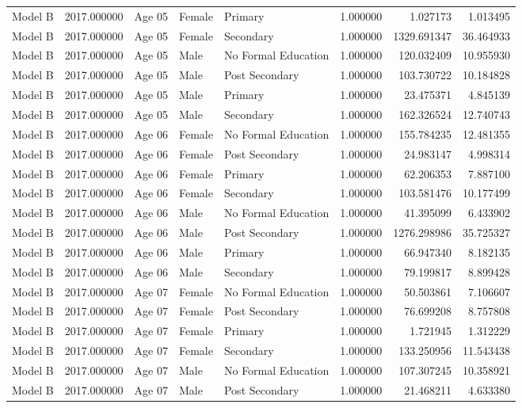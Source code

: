 \begin{table}[ht]
\begin{tabular}{lrlllrrr}
Model B & 2017.000000 & Age 05 & Female & Primary & 1.000000 & 1.027173 & 1.013495 \\
Model B & 2017.000000 & Age 05 & Female & Secondary & 1.000000 & 1329.691347 & 36.464933 \\
Model B & 2017.000000 & Age 05 & Male & No Formal Education & 1.000000 & 120.032409 & 10.955930 \\
Model B & 2017.000000 & Age 05 & Male & Post Secondary & 1.000000 & 103.730722 & 10.184828 \\
Model B & 2017.000000 & Age 05 & Male & Primary & 1.000000 & 23.475371 & 4.845139 \\
Model B & 2017.000000 & Age 05 & Male & Secondary & 1.000000 & 162.326524 & 12.740743 \\
Model B & 2017.000000 & Age 06 & Female & No Formal Education & 1.000000 & 155.784235 & 12.481355 \\
Model B & 2017.000000 & Age 06 & Female & Post Secondary & 1.000000 & 24.983147 & 4.998314 \\
Model B & 2017.000000 & Age 06 & Female & Primary & 1.000000 & 62.206353 & 7.887100 \\
Model B & 2017.000000 & Age 06 & Female & Secondary & 1.000000 & 103.581476 & 10.177499 \\
Model B & 2017.000000 & Age 06 & Male & No Formal Education & 1.000000 & 41.395099 & 6.433902 \\
Model B & 2017.000000 & Age 06 & Male & Post Secondary & 1.000000 & 1276.298986 & 35.725327 \\
Model B & 2017.000000 & Age 06 & Male & Primary & 1.000000 & 66.947340 & 8.182135 \\
Model B & 2017.000000 & Age 06 & Male & Secondary & 1.000000 & 79.199817 & 8.899428 \\
Model B & 2017.000000 & Age 07 & Female & No Formal Education & 1.000000 & 50.503861 & 7.106607 \\
Model B & 2017.000000 & Age 07 & Female & Post Secondary & 1.000000 & 76.699208 & 8.757808 \\
Model B & 2017.000000 & Age 07 & Female & Primary & 1.000000 & 1.721945 & 1.312229 \\
Model B & 2017.000000 & Age 07 & Female & Secondary & 1.000000 & 133.250956 & 11.543438 \\
Model B & 2017.000000 & Age 07 & Male & No Formal Education & 1.000000 & 107.307245 & 10.358921 \\
Model B & 2017.000000 & Age 07 & Male & Post Secondary & 1.000000 & 21.468211 & 4.633380 \\

\end{tabular}
\end{table}
